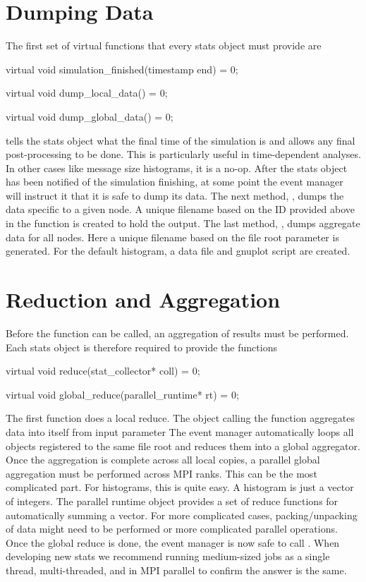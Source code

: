\section{Dumping Data}\label{sec:dumping}
The first set of virtual functions that every stats object must provide are

\begin{CppCode}
virtual void
simulation_finished(timestamp end) = 0;

virtual void
dump_local_data() = 0;

virtual void
dump_global_data() = 0;
\end{CppCode}

 tells the stats object what the final time of the simulation is and allows any final post-processing to be done.
This is particularly useful in time-dependent analyses.  In other cases like message size histograms, it is a no-op.
After the stats object has been notified of the simulation finishing, at some point the event manager will instruct it that it is safe to dump its data.
The next method, , dumps the data specific to a given node.
A unique filename based on the ID provided above in the  function is created to hold the output.
The last method, , dumps aggregate data for all nodes.
Here a unique filename based on the file root parameter is generated.
For the default histogram, a data file and gnuplot script are created.

\section{Reduction and Aggregation}\label{sec:reduceStats}
Before the  function can be called, an aggregation of results must be performed.
Each stats object is therefore required to provide the functions

\begin{CppCode} 
virtual void
reduce(stat_collector* coll) = 0;

virtual void
global_reduce(parallel_runtime* rt) = 0;
\end{CppCode}
The first function does a local reduce.
The object calling the  function aggregates data into itself from input parameter 
The event manager automatically loops all objects registered to the same file root and reduces them into a global aggregator.
Once the aggregation is complete across all local copies,
a parallel global aggregation must be performed across MPI ranks.
This can be the most complicated part.
For histograms, this is quite easy.
A histogram is just a vector of integers.
The \sstmacro parallel runtime object provides a set of reduce functions for automatically summing a vector.
For more complicated cases, packing/unpacking of data might need to be performed or more complicated parallel operations.
Once the global reduce is done, the event manager is now safe to call .
When developing new stats we recommend running medium-sized jobs as a single thread, multi-threaded, and in MPI parallel to confirm the answer is the same.

